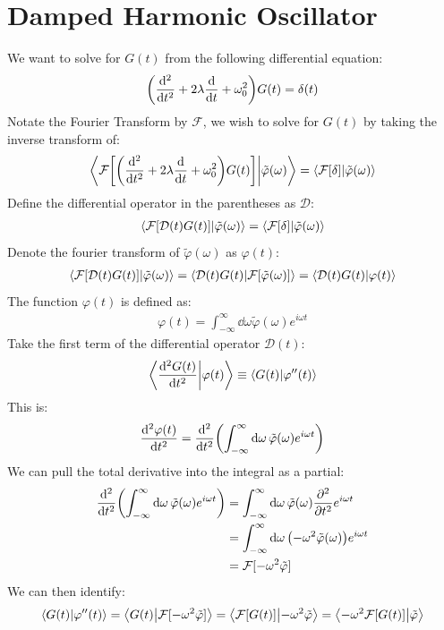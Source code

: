 \documentclass[12pt]{article}
\newcommand{\F}{\mathcal{F}}
\newcommand{\mcD}{\mathcal{D}}
\newcommand{\vphi}{\varphi}
\newcommand{\vtphi}{\tilde{\varphi}}
\begin{document}
\section{Damped Harmonic Oscillator}
We want to solve for $G(t)$ from the following differential equation:
\begin{align*}
  \qty(\dv[2]{t}+2\lambda\dv{t}+\omega_0^2)G(t)=\delta(t)
\end{align*}
Notate the Fourier Transform by $\F$, we wish to solve for $G(t)$ by taking the inverse transform of:
\begin{align*}
  \ip{\F\qty[\qty(\dv[2]{t}+2\lambda\dv{t}+\omega_0^2)G(t)]}{\vtphi(\omega)}=
  \ip{\F\qty[\delta]}{\vtphi(\omega)}
\end{align*}
Define the differential operator in the parentheses as $\mathcal{D}$:
\begin{align*}
  \ip{\F[\mcD(t)G(t)]}{\vtphi(\omega)}=\ip{\F[\delta]}{\vtphi(\omega)}
\end{align*}
Denote the fourier transform of $\vtphi(\omega)$ as $\vphi(t)$:
\begin{align*}
  \ip{\F[\mcD(t)G(t)]}{\vtphi(\omega)}=
  \ip{\mcD(t)G(t)}{\F[\vtphi(\omega)]}=
  \ip{\mcD(t)G(t)}{\vphi(t)}
\end{align*}
The function $\vphi(t)$ is defined as:
\begin{align*}
  \vphi(t)=\int_{-\infty}^\infty\dd{\omega}\vtphi(\omega)
  e^{i\omega t}
\end{align*}
Take the first term of the differential operator $\mcD(t)$:
\begin{align*}
  \ip{\dv[2]{G(t)}{t}}{\vphi(t)}\equiv\ip{G(t)}{\vphi''(t)}
\end{align*}
This is:
\begin{align*}
  \dv[2]{\vphi(t)}{t}=\dv[2]{t}\qty(
  \int_{-\infty}^\infty\dd{\omega}\vtphi(\omega)e^{i\omega t})
\end{align*}
We can pull the total derivative into the integral as a partial:
\begin{align*}
  \dv[2]{t}\qty(
  \int_{-\infty}^\infty\dd{\omega}\vtphi(\omega)e^{i\omega t})&=
  \int_{-\infty}^\infty\dd{\omega}\vtphi(\omega)
  \pdv[2]{t}e^{i\omega t}\\ &=
  \int_{-\infty}^\infty\dd{\omega}\qty(-\omega^2\vtphi(\omega))
  e^{i\omega t}\\
  &=\F[-\omega^2\vtphi]
\end{align*}
We can then identify:
\begin{align*}
  \ip{G(t)}{\vphi''(t)}=\ip{G(t)}{\F[-\omega^2\vtphi]}=
  \ip{\F[G(t)]}{-\omega^2\vtphi}=\ip{-\omega^2\F[G(t)]}{\vtphi}
\end{align*}
\end{document}
